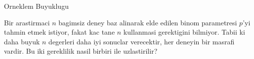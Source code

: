 \documentclass[12pt,fleqn]{article}\usepackage{../common}
\begin{document}
Orneklem Buyuklugu

Bir arastirmaci $n$ bagimsiz deney baz alinarak elde edilen binom
parametresi $p$'yi tahmin etmek istiyor, fakat kac tane $n$ kullanmasi
gerektigini bilmiyor. Tabii ki daha buyuk $n$ degerleri daha iyi sonuclar
verecektir, her deneyin bir masrafi vardir. Bu iki gereklilik nasil birbiri
ile uzlastirilir?
\end{document}
